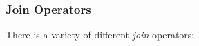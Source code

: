 

\subsubsection{Join Operators}
\label{join}

There is a variety of different \emph{join} operators:

\newcommand{\lefttable}{\begin{array}{|c|c|}\hline\multicolumn{2}{|c|}{R} \\\hline A & B \\\hline\hline	a_1 & b_1 \\ a_2 & b_2 \\\hline \end{array}}
\newcommand{\righttable}{\begin{array}{|c|c|} \hline\multicolumn{2}{|c|}{S} \\\hline B & C \\\hline\hline b_1 & c_1 \\ b_3 & c_2 \\\hline \end{array}}

